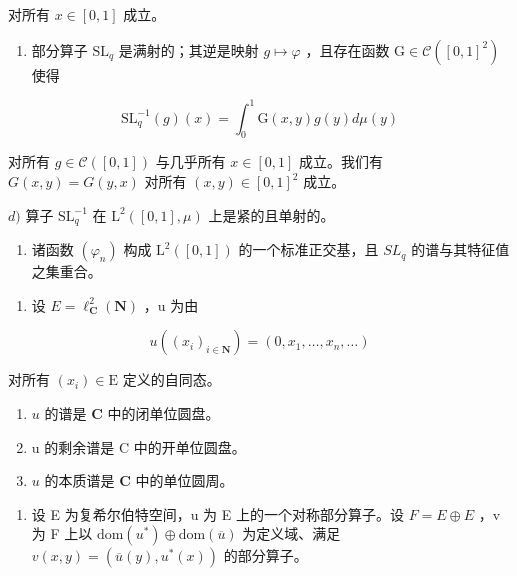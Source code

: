 对所有 \(x \in [0,1]\) 成立。

\begin{enumerate}
\def\labelenumi{\alph{enumi})}
\setcounter{enumi}{2}
\tightlist
\item
  部分算子 \(\mathrm{SL}_q\) 是满射的；其逆是映射 \(g\mapsto \varphi\) ，且存在函数 \(\mathrm{G}\in \mathcal{C}([0,1]^2)\) 使得
\end{enumerate}

\[
\mathrm{SL} _ {q} ^ {- 1} (g) (x) = \int_ {0} ^ {1} \mathrm{G} (x, y) g (y) d \mu (y)
\]

对所有 \(g \in \mathcal{C}([0,1])\) 与几乎所有 \(x \in [0,1]\) 成立。我们有 \(G(x,y) = G(y,x)\) 对所有 \((x,y) \in [0,1]^2\) 成立。

\(d)\) 算子 \(\mathrm{SL}_q^{-1}\) 在 \(\mathrm{L}^2 ([0,1],\mu)\) 上是紧的且单射的。

\begin{enumerate}
\def\labelenumi{\alph{enumi})}
\setcounter{enumi}{4}
\tightlist
\item
  诸函数 \((\varphi_{n})\) 构成 \(\mathrm{L}^{2}([0,1])\) 的一个标准正交基，且 \(SL_{q}\) 的谱与其特征值之集重合。
\end{enumerate}

\begin{enumerate}
\def\labelenumi{\arabic{enumi})}
\setcounter{enumi}{22}
\tightlist
\item
  设 \(E = \ell_{\mathbf{C}}^{2}(\mathbf{N})\) ，u 为由
\end{enumerate}

\[
u ((x _ {i}) _ {i \in \mathbf {N}}) = (0, x _ {1}, \dots , x _ {n}, \dots)
\]

对所有 \((x_{i})\in \mathrm{E}\) 定义的自同态。

\begin{enumerate}
\def\labelenumi{\alph{enumi})}
\item
  \(u\) 的谱是 \(\mathbf{C}\) 中的闭单位圆盘。
\item
  u 的剩余谱是 C 中的开单位圆盘。
\item
  \(u\) 的本质谱是 \(\mathbf{C}\) 中的单位圆周。
\end{enumerate}

\begin{enumerate}
\def\labelenumi{\arabic{enumi})}
\setcounter{enumi}{23}
\tightlist
\item
  设 E 为复希尔伯特空间，u 为 E 上的一个对称部分算子。设 \(F = E \oplus E\) ，v 为 F 上以 \(\text{dom}(u^{*}) \oplus \text{dom}(\overline{u})\) 为定义域、满足 \(v(x, y) = (\overline{u}(y), u^{*}(x))\) 的部分算子。
\end{enumerate}

